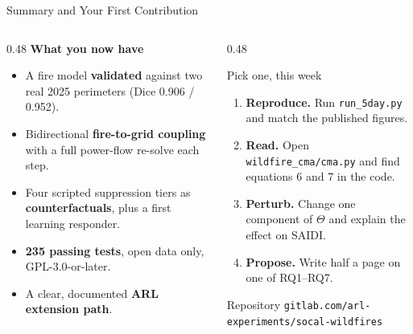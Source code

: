 \documentclass[aspectratio=169,9pt]{beamer}
\newcommand{\code}[1]{{\small\texttt{#1}}}
\newcommand{\gold}[1]{{\color{cslaeaglegold}\textbf{#1}}}
\begin{document}
\begin{frame}{Summary and Your First Contribution}{}
  \begin{columns}[T,onlytextwidth]
    \begin{column}{0.48\textwidth}
      \textbf{What you now have}
      \begin{itemize}
        \small
        \item A fire model \gold{validated} against two real 2025 perimeters
              (Dice 0.906 / 0.952).
        \item Bidirectional \gold{fire-to-grid coupling} with a full
              power-flow re-solve each step.
        \item Four scripted suppression tiers as \gold{counterfactuals},
              plus a first learning responder.
        \item \gold{235 passing tests}, open data only, GPL-3.0-or-later.
        \item A clear, documented \gold{ARL extension path}.
      \end{itemize}
    \end{column}
    \begin{column}{0.48\textwidth}
      \begin{alertblock}{Pick one, this week}
        \small
        \begin{enumerate}
          \item \textbf{Reproduce.} Run \code{run\_5day.py} and match the
                published figures.
          \item \textbf{Read.} Open \code{wildfire\_cma/cma.py} and find
                equations 6 and 7 in the code.
          \item \textbf{Perturb.} Change one component of $\Theta$ and
                explain the effect on SAIDI.
          \item \textbf{Propose.} Write half a page on one of RQ1--RQ7.
        \end{enumerate}
      \end{alertblock}
      \vskip2pt
      \begin{block}{Repository}
        \centering\small
        \texttt{gitlab.com/arl-experiments/socal-wildfires}
      \end{block}
    \end{column}
  \end{columns}
\end{frame}
\end{document}
